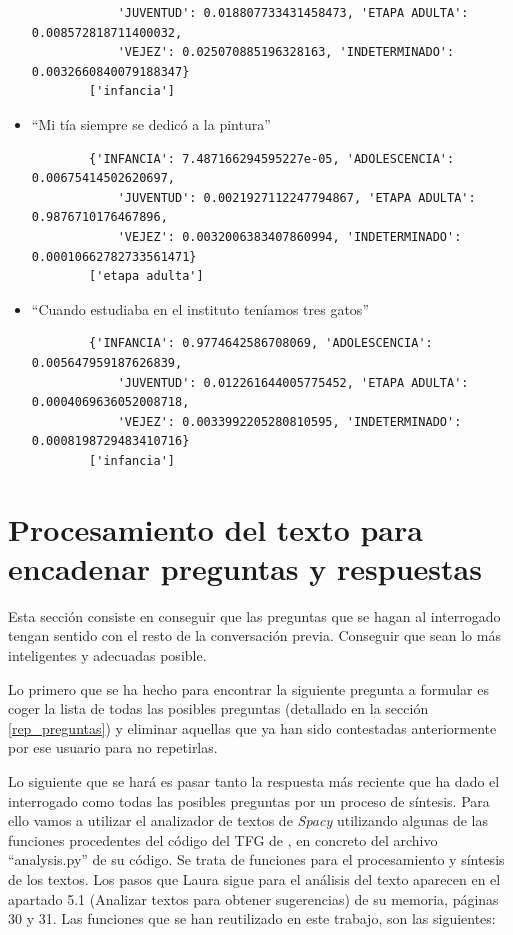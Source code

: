 \begin{itemize}
\begin{verbatim}
			'JUVENTUD': 0.018807733431458473, 'ETAPA ADULTA': 0.008572818711400032, 
			'VEJEZ': 0.025070885196328163, 'INDETERMINADO': 0.0032660840079188347}
		['infancia']
	\end{verbatim}
	\item ``Mi tía siempre se dedicó a la pintura''
	\begin{verbatim}
		{'INFANCIA': 7.487166294595227e-05, 'ADOLESCENCIA': 0.00675414502620697, 
			'JUVENTUD': 0.0021927112247794867, 'ETAPA ADULTA': 0.9876710176467896, 
			'VEJEZ': 0.0032006383407860994, 'INDETERMINADO': 0.00010662782733561471}
		['etapa adulta']
	\end{verbatim}
	\item ``Cuando estudiaba en el instituto teníamos tres gatos''
	\begin{verbatim}
		{'INFANCIA': 0.9774642586708069, 'ADOLESCENCIA': 0.005647959187626839, 
			'JUVENTUD': 0.012261644005775452, 'ETAPA ADULTA': 0.0004069636052008718, 
			'VEJEZ': 0.0033992205280810595, 'INDETERMINADO': 0.0008198729483410716}
		['infancia']
	\end{verbatim}
	
\end{itemize}



\section{Procesamiento del texto para encadenar preguntas y respuestas} \label{procesamiento}
 
Esta sección consiste en conseguir que las preguntas que se hagan al interrogado tengan sentido con el resto de la conversación previa. Conseguir que sean lo más inteligentes y adecuadas posible. 

Lo primero que se ha hecho para encontrar la siguiente pregunta a formular es coger la lista de todas las posibles preguntas (detallado en la sección \ref{rep_preguntas}) y eliminar aquellas que ya han sido contestadas anteriormente por ese usuario para no repetirlas. 

Lo siguiente que se hará es pasar tanto la respuesta más reciente que ha dado el interrogado como todas las posibles preguntas por un proceso de síntesis. Para ello vamos a utilizar el analizador de textos de \textit{Spacy} utilizando algunas de las funciones procedentes del código del TFG de \cite{lcastilla}, en concreto del archivo ``analysis.py'' de su código. Se trata de funciones para el procesamiento y síntesis de los textos. Los pasos que Laura sigue para el análisis del texto aparecen en el apartado 5.1 (Analizar textos para obtener sugerencias) de su memoria, páginas 30 y 31. Las funciones que se han reutilizado en este trabajo, son las siguientes:

